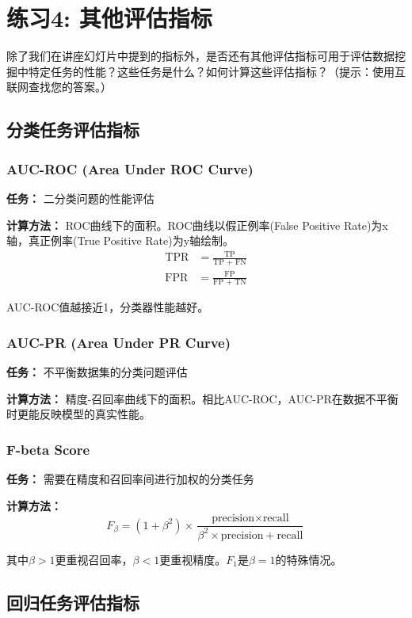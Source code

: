 \documentclass[a4paper]{article}
\begin{document}
\section{练习4: 其他评估指标}

除了我们在讲座幻灯片中提到的指标外，是否还有其他评估指标可用于评估数据挖掘中特定任务的性能？这些任务是什么？如何计算这些评估指标？（提示：使用互联网查找您的答案。）

\subsection{分类任务评估指标}

\subsubsection{AUC-ROC (Area Under ROC Curve)}
\textbf{任务：} 二分类问题的性能评估

\textbf{计算方法：} ROC曲线下的面积。ROC曲线以假正例率(False Positive Rate)为x轴，真正例率(True Positive Rate)为y轴绘制。
\begin{align}
\text{TPR} &= \frac{\text{TP}}{\text{TP + FN}} \\
\text{FPR} &= \frac{\text{FP}}{\text{FP + TN}}
\end{align}

AUC-ROC值越接近1，分类器性能越好。

\subsubsection{AUC-PR (Area Under PR Curve)}
\textbf{任务：} 不平衡数据集的分类问题评估

\textbf{计算方法：} 精度-召回率曲线下的面积。相比AUC-ROC，AUC-PR在数据不平衡时更能反映模型的真实性能。

\subsubsection{F-beta Score}
\textbf{任务：} 需要在精度和召回率间进行加权的分类任务

\textbf{计算方法：}
$$F_\beta = (1+\beta^2) \times \frac{\text{precision} \times \text{recall}}{\beta^2 \times \text{precision} + \text{recall}}$$

其中$\beta > 1$更重视召回率，$\beta < 1$更重视精度。$F_1$是$\beta = 1$的特殊情况。

\subsection{回归任务评估指标}
\end{document}
